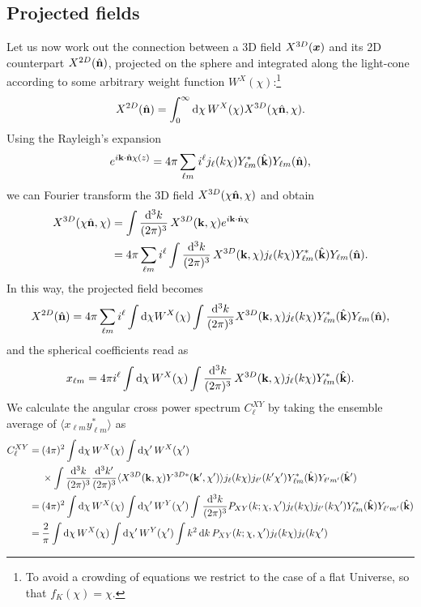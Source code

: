 \subsection{Projected fields}
Let us now work out the connection between a 3D field $X^{\mathrm 3D}(\bm{x})$ and its 2D counterpart $X^{\mathrm 2D}(\hat{\mathbf{n}})$, projected
on the sphere and integrated along the light-cone according to some arbitrary weight function $W^X(\chi)$:\footnote{To avoid a crowding of equations we restrict to the case of a flat Universe, so that $f_K(\chi)=\chi$.}
%
\begin{equation}
X^{\mathrm 2D}(\hat{\mathbf{n}}) = \int_0^{\infty} \mathop{}\!\mathrm{d}\chi\,  W^X(\chi) X^{\mathrm 3D}(\chi\hat{\mathbf{n}},\chi).
\end{equation}
%
Using the Rayleigh's expansion
\begin{equation}
e^{i\mathbf{k}\cdot\hat{\mathbf{n}}\chi(z)} = 4\pi\sum_{\ell m}i^{\ell}j_{\ell}(k\chi)Y^*_{\ell m}(\hat{\mathbf{k}})Y_{\ell m}(\hat{\mathbf{n}}),
\end{equation}
we can Fourier transform the 3D field $X^{\mathrm 3D}(\chi\hat{\mathbf{n}},\chi)$ and obtain
%
\begin{equation}
\begin{split}
X^{\mathrm 3D}(\chi\hat{\mathbf{n}}, \chi) &= \int \frac{\mathop{}\!\mathrm{d}^3k}{(2\pi)^3}\,X^{\mathrm 3D}(\mathbf{k}, \chi) e^{i\mathbf{k}\cdot\hat{\mathbf{n}}\chi} \\
&=4\pi\sum_{\ell m}i^{\ell}\int \frac{\mathop{}\!\mathrm{d}^3k}{(2\pi)^3}\,X^{\mathrm 3D}(\mathbf{k}, \chi) j_{\ell}(k\chi)Y^*_{\ell m}(\hat{\mathbf{k}})Y_{\ell m}(\hat{\mathbf{n}}).
\end{split}
\end{equation}
%
In this way, the projected field becomes
%
\begin{equation}
X^{\mathrm 2D}(\hat{\mathbf{n}})= 4\pi\sum_{\ell m}i^{\ell}\int \mathop{}\!\mathrm{d}\chi W^X(\chi) \int \frac{\mathop{}\!\mathrm{d}^3k}{(2\pi)^3}X^{\mathrm 3D}(\mathbf{k}, \chi) j_{\ell}(k\chi)Y^*_{\ell m}(\hat{\mathbf{k}})Y_{\ell m}(\hat{\mathbf{n}}),
\end{equation}
%
and the spherical coefficients read as 
\begin{equation}
x_{\ell m} =4\pi i^{\ell} \int \mathop{}\!\mathrm{d}\chi\, W^X(\chi) \int \frac{\mathop{}\!\mathrm{d}^3k}{(2\pi)^3}\,X^{\mathrm 3D}(\mathbf{k}, \chi) j_{\ell}(k\chi)Y^*_{\ell m}(\hat{\mathbf{k}}).
\end{equation}
We calculate the angular cross power spectrum $C_{\ell}^{XY}$ by taking the ensemble average of $\langle x_{\ell m}y^*_{\ell m}\rangle $ as 
%
\begin{equation}
\begin{split}
C_{\ell}^{XY} =\:&  (4\pi)^2 \int \diff\chi\, W^X(\chi)\int \diff\chi'\, W^X(\chi')\\
&\times \int\frac{\diff^3k}{(2\pi)^3}\frac{\diff^3k'}{(2\pi)^3}\langle X^{\rm 3D}(\mathbf{k}, \chi) Y^{\rm 3D*}(\mathbf{k'}, \chi') \rangle 
 j_{\ell}(k\chi)j_{\ell'}(k'\chi')Y^*_{\ell m}(\kver)Y_{\ell' m'}(\kver') \\
=\:& (4\pi)^2 \int \diff\chi\, W^X(\chi)\int \diff\chi'\, W^Y(\chi')\int\frac{\diff^3k}{(2\pi)^3}  P_{XY}(k;\chi,\chi') j_{\ell}(k\chi)j_{\ell'}(k\chi')Y^*_{\ell m}(\kver)Y_{\ell' m'}(\kver) \\
=\:& \frac{2}{\pi}\int \diff\chi\, W^X(\chi)\int \diff\chi'\, W^Y(\chi')\int k^2\diff k\,  P_{XY}(k;\chi,\chi') j_{\ell}(k\chi)j_{\ell}(k\chi') 
\end{split}
\end{equation}
